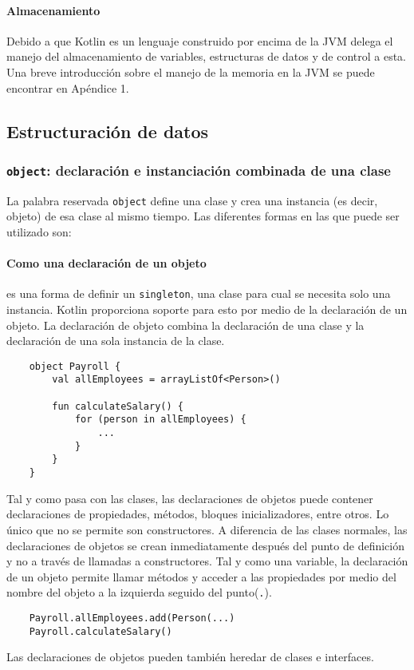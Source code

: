 \paragraph{Almacenamiento} Debido a que Kotlin es un lenguaje construido por encima de la JVM delega el manejo del almacenamiento de variables, estructuras de datos y de control a esta. Una breve introducción sobre el manejo de la memoria en la JVM se puede encontrar en Apéndice 1.
 
\subsection{Estructuración de datos}
\subsubsection{\texttt{object}: declaración e instanciación combinada de una clase}
La palabra reservada \texttt{object} define una clase y crea una instancia (es decir, objeto) de esa clase al mismo tiempo. Las diferentes formas en las que puede ser utilizado son:

\paragraph{Como una declaración de un objeto} es una forma de definir un \texttt{singleton}, una clase para cual se necesita solo una instancia. Kotlin proporciona soporte para esto por medio de la declaración de un objeto. La declaración de objeto combina la declaración de una clase y la declaración de una sola instancia de la clase.

\begin{verbatim}
    object Payroll {
        val allEmployees = arrayListOf<Person>()
        
        fun calculateSalary() {
            for (person in allEmployees) {
                ...
            }
        }
    }
\end{verbatim}
 
Tal y como pasa con las clases, las declaraciones de objetos puede contener declaraciones de propiedades, métodos, bloques inicializadores, entre otros. Lo único que no se permite son constructores. A diferencia de las clases normales, las declaraciones de objetos se crean inmediatamente después del punto de definición y no a través de llamadas a constructores. Tal y como una variable, la declaración de un objeto permite llamar métodos y acceder a las propiedades por medio del nombre del objeto a la izquierda seguido del punto(\texttt{.}).
\begin{verbatim}
    Payroll.allEmployees.add(Person(...)
    Payroll.calculateSalary()
\end{verbatim}
Las declaraciones de objetos pueden también heredar de clases e interfaces.


